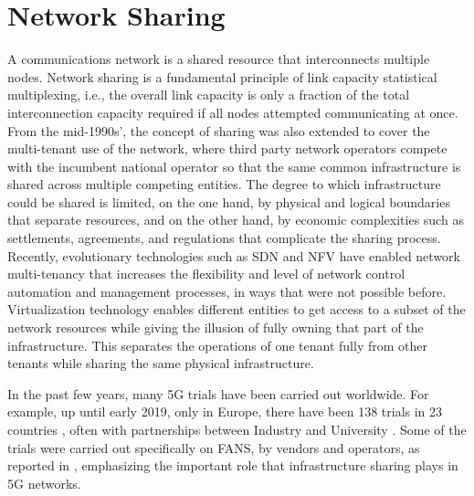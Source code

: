 \section{Network Sharing}
\label{Back:Sec:sharing}

A communications network is a shared resource that interconnects multiple nodes. Network sharing is a fundamental principle of link capacity statistical multiplexing, i.e., the overall link capacity is only a fraction of the total interconnection capacity required if all nodes attempted communicating at once.
From the mid-1990s', the concept of sharing was also extended to cover the multi-tenant use of the network, where third party network operators compete with the incumbent national operator so that the same common infrastructure is shared across multiple competing entities. %
The degree to which infrastructure could be shared is limited, on the one hand, by physical and logical boundaries that separate resources, and on the other hand, by economic complexities such as settlements, agreements, and regulations that complicate the sharing process. Recently, evolutionary technologies such as \ac{SDN} and \ac{NFV} have enabled network multi-tenancy that increases the flexibility and level of network control automation and management processes, in ways that were not possible before.
Virtualization technology enables different entities to get access to a subset of the network resources while giving the illusion of fully owning that part of the infrastructure. This separates the operations of one tenant fully from other tenants while sharing the same physical infrastructure.

In the past few years, many \ac{5G} trials have been carried out worldwide. For example, up until early 2019, only in Europe, there have been 138 trials in 23 countries \cite{5G_observatory}, often with partnerships between Industry and University \cite{bristol}. Some of the trials were carried out specifically on \ac{FANS}, by vendors and operators, as reported in \cite{nokia_trial,huawei_trial}, emphasizing the important role that infrastructure sharing plays in \ac{5G} networks.

